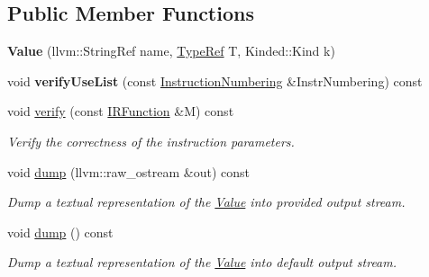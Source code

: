 \subsection*{Public Member Functions}
\begin{DoxyCompactItemize}
\item 
\mbox{\label{classglow_1_1_value_a06b5d7cc0da900e82e20772670ffa454}} 
{\bfseries Value} (llvm\+::\+String\+Ref name, \hyperlink{structglow_1_1_type}{Type\+Ref} T, Kinded\+::\+Kind k)
\item 
\mbox{\label{classglow_1_1_value_a5930691b84231f9b2250900d77821d89}} 
void {\bfseries verify\+Use\+List} (const \hyperlink{classglow_1_1_instruction_numbering}{Instruction\+Numbering} \&Instr\+Numbering) const
\item 
\mbox{\label{classglow_1_1_value_a09c8a08a8a999b41ba4edb4d0fb3ba5e}} 
void \hyperlink{classglow_1_1_value_a09c8a08a8a999b41ba4edb4d0fb3ba5e}{verify} (const \hyperlink{classglow_1_1_i_r_function}{I\+R\+Function} \&M) const
\begin{DoxyCompactList}\small\item\em Verify the correctness of the instruction parameters. \end{DoxyCompactList}\item 
\mbox{\label{classglow_1_1_value_a93c5ee49e7965b84588628da9078b3fb}} 
void \hyperlink{classglow_1_1_value_a93c5ee49e7965b84588628da9078b3fb}{dump} (llvm\+::raw\+\_\+ostream \&out) const
\begin{DoxyCompactList}\small\item\em Dump a textual representation of the \hyperlink{classglow_1_1_value}{Value} into provided output stream. \end{DoxyCompactList}\item 
\mbox{\label{classglow_1_1_value_a0a72ac2d129c99bbead406c2c33155fc}} 
void \hyperlink{classglow_1_1_value_a0a72ac2d129c99bbead406c2c33155fc}{dump} () const
\begin{DoxyCompactList}\small\item\em Dump a textual representation of the \hyperlink{classglow_1_1_value}{Value} into default output stream. \end{DoxyCompactList}\item 

\end{DoxyCompactItemize}

